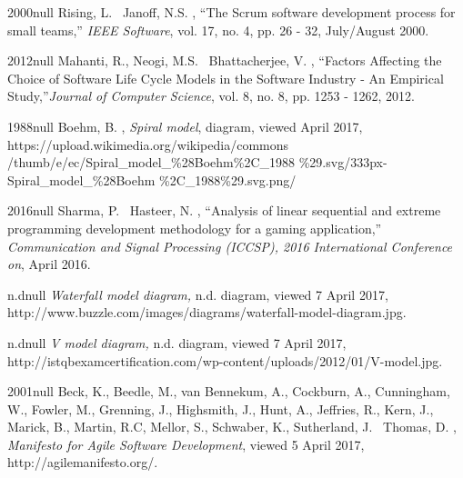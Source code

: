 \documentclass{CRPITStyle}
\begin{document}
\begin{thebibliography}{xx}
	\harvarditem{[Rising]}
	{2000}{null}
	Rising, L. \harvardand\ Janoff, N.S. \harvardyearright, ``The Scrum software development process for small teams,''\textit{ IEEE Software}, vol. 17, no. 4, pp. 26 - 32, July/August 2000. 
	
	\harvarditem{[Mahanti]}
	{2012}{null}
	Mahanti, R., Neogi, M.S. \harvardand\ Bhattacherjee, V. \harvardyearright, ``Factors Affecting the Choice of Software Life Cycle Models in the Software Industry - An Empirical Study,''\textit{Journal of Computer Science},
	vol. 8, no. 8, pp. 1253 - 1262, 2012.
	
	\harvarditem{[Boehm2]}
	{1988}{null}
	Boehm, B. \harvardyearright, \textit{Spiral model}, diagram, viewed April 2017,
	https://upload.wikimedia.org/wikipedia/commons
/thumb/e/ec/Spiral\_model\_\%28Boehm\%2C\_1988
	\%29.svg/333px-Spiral\_model\_\%28Boehm
	\%2C\_1988\%29.svg.png/
	
	\harvarditem{[Sharma]}
	{2016}{null}
	Sharma, P. \harvardand\ Hasteer, N. \harvardyearright, ``Analysis of linear sequential and extreme programming development methodology for a gaming application,'' \textit{ Communication and Signal Processing (ICCSP), 2016 International Conference on}, April 2016.
	
	\harvarditem{[WaterfallDiagram]}
	{n.d}{null}
	\textit{Waterfall model diagram,} n.d. diagram, viewed 7 April 2017, http://www.buzzle.com/images/diagrams/waterfall-model-diagram.jpg.
	
	\harvarditem{[VModelDiagram]}
	{n.d}{null}
	\textit{V model diagram,} n.d. diagram, viewed 7 April 2017, http://istqbexamcertification.com/wp-content/uploads/2012/01/V-model.jpg.
	
	\harvarditem{[agileManifesto]}
	{2001}{null}
	Beck, K., Beedle, M., van Bennekum, A., Cockburn, A., Cunningham, W., Fowler, M., Grenning, J., Highsmith, J., Hunt, A., Jeffries, R., Kern, J., Marick, B., Martin, R.C,
	Mellor, S., Schwaber, K., Sutherland, J. \harvardand\ Thomas, D. \harvardyearright, \textit{Manifesto for Agile Software Development}, viewed 5 April 2017, http://agilemanifesto.org/.
	
\end{thebibliography}
		
\end{document}
